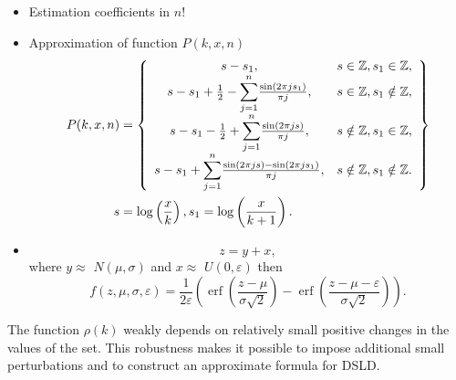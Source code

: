 \documentclass[titlepage,fleqn]{article}%
\providecommand{\U}[1]{\protect\rule{.1in}{.1in}}
\begin{document}
\begin{itemize}
\item Estimation coefficients in $n!$

\item Approximation of function $P(k,x,n)$
\begin{align}
P(k,x,n)  &  =\left\{
\begin{array}
[c]{cc}%
s-s_{1}, & s\in%
\mathbb{Z}
,s_{1}\in%
\mathbb{Z}
,\\
s-s_{1}+\frac{1}{2}-%
{\displaystyle\sum\limits_{j=1}^{n}}
\frac{\sin(2\pi js_{1})}{\pi j}, & s\in%
\mathbb{Z}
,s_{1}\notin%
\mathbb{Z}
,\\
s-s_{1}-\frac{1}{2}+%
{\displaystyle\sum\limits_{j=1}^{n}}
\frac{\sin(2\pi js)}{\pi j}, & s\notin%
\mathbb{Z}
,s_{1}\in%
\mathbb{Z}
,\\
s-s_{1}+%
{\displaystyle\sum\limits_{j=1}^{n}}
\frac{\sin(2\pi js)-\sin(2\pi js_{1})}{\pi j}, & s\notin%
\mathbb{Z}
,s_{1}\notin%
\mathbb{Z}
.
\end{array}
\right\} \label{RHOa}\\
s  &  =\log\left(  \frac{x}{k}\right)  ,s_{1}=\log\left(  \frac{x}%
{k+1}\right)  .\nonumber
\end{align}


\item
\[
z=y+x,
\]
where $y\approx$ $N(\mu,\sigma)$ and $x\approx$ $U(0,\varepsilon)$ then%
\[
f(z,\mu,\sigma,\varepsilon)=\frac{1}{2\varepsilon}\left(  \operatorname{erf}%
\left(  \frac{z-\mu}{\sigma\sqrt{2}}\right)  -\operatorname{erf}\left(
\frac{z-\mu-\varepsilon}{\sigma\sqrt{2}}\right)  \right)  .
\]

\end{itemize}

The function $\rho(k)$ weakly depends on relatively small positive changes in
the values of the set. This robustness makes it possible to impose additional
small perturbations and to construct an approximate formula for DSLD.
\end{document}
